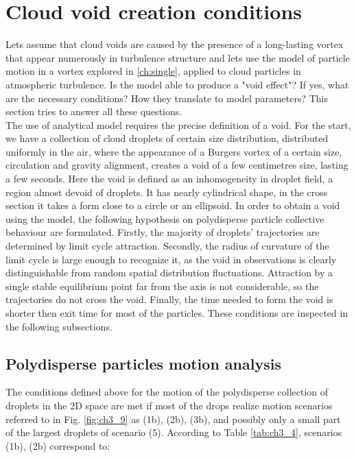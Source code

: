\documentclass[../main.tex]{subfiles}
\begin{document}
\section{Cloud void creation conditions}
\label{ch4s2}
Lets assume that cloud voids are caused by the presence of a long-lasting vortex that appear numerously in turbulence structure and lets use the model of particle motion in a vortex explored in \autoref{ch:single}, applied to cloud particles in atmospheric turbulence. Is the model able to produce a "void effect"? If yes, what are the necessary conditions? How they translate to model parameters? This section tries to answer all these questions.\\
The use of analytical model requires the precise definition of a void. For the start, we have a collection of cloud droplets of certain size distribution, distributed uniformly in the air, where the appearance of a Burgers vortex of a certain size, circulation and gravity alignment, creates a void of a few centimetres size, lasting a few seconds. Here the void is defined as an inhomogeneity in droplet field, a region almost devoid of droplets. It has nearly cylindrical shape, in the cross section it takes a form close to a circle or an ellipsoid. In order to obtain a void using the model, the following hypothesis on polydisperse particle collective behaviour are formulated. Firstly, the majority of droplets' trajectories are determined by limit cycle attraction. Secondly, the radius of curvature of the limit cycle is large enough to recognize it, as the void in observations is clearly distinguishable from random spatial distribution fluctuations. Attraction by a single stable equilibrium point far from the axis is not considerable, so the trajectories do not cross the void. Finally, the time needed to form the void is shorter then exit time for most of the particles. These conditions are inspected in the following subsections.

\subsection{Polydisperse particles motion analysis}
\label{ssec:poly}

The conditions defined above for the motion of the polydisperse collection of droplets in the 2D space are met if most of the drops realize motion scenarios referred to in Fig. \autoref{fig:ch3_9} as (1b), (2b), (3b), and possibly only a small part of the largest droplets of scenario (5). According to Table \autoref{tab:ch3_4}, scenarios (1b), (2b) correspond to:
\end{document}
